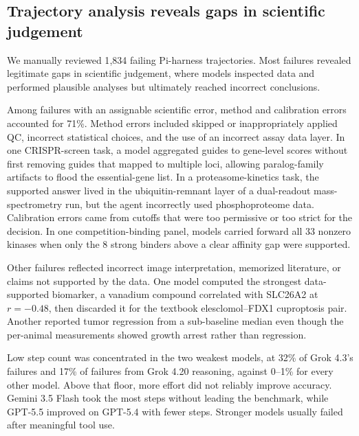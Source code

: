 \documentclass[10pt,letterpaper]{article}
\begin{document}
\ResumeBody

\subsection{Trajectory analysis reveals gaps in scientific judgement}

We manually reviewed 1{,}834 failing Pi-harness trajectories. Most failures
revealed legitimate gaps in scientific judgement, where models inspected data
and performed plausible analyses but ultimately reached incorrect conclusions.

Among failures with an assignable scientific error, method and calibration
errors accounted for 71\%. Method errors included skipped or inappropriately
applied QC, incorrect statistical choices, and the use of an incorrect assay
data layer. In one CRISPR-screen task, a model aggregated guides to gene-level
scores without first removing guides that mapped to multiple loci, allowing
paralog-family artifacts to flood the essential-gene list. In a
proteasome-kinetics task, the supported answer lived in the ubiquitin-remnant
layer of a dual-readout mass-spectrometry run, but the agent incorrectly used
phosphoproteome data. Calibration errors came from cutoffs that were too
permissive or too strict for the decision. In one
competition-binding panel, models carried forward all 33 nonzero kinases when
only the 8 strong binders above a clear affinity gap were supported.

Other failures reflected incorrect image interpretation, memorized literature,
or claims not supported by the data. One model computed the strongest
data-supported biomarker, a vanadium compound correlated with SLC26A2 at
$r=-0.48$, then discarded it for the textbook elesclomol--FDX1 cuproptosis pair.
Another reported tumor regression from a sub-baseline median even though the
per-animal measurements showed growth arrest rather than regression.

Low step count was concentrated in the two weakest models, at 32\% of Grok
4.3's failures and 17\% of failures from Grok 4.20 reasoning, against 0--1\%
for every other model. Above that floor, more effort did not reliably improve accuracy.
Gemini 3.5 Flash took the most steps without leading the benchmark, while
GPT-5.5 improved on GPT-5.4 with fewer steps. Stronger models usually failed
after meaningful tool use.

\EndBody
\end{document}

